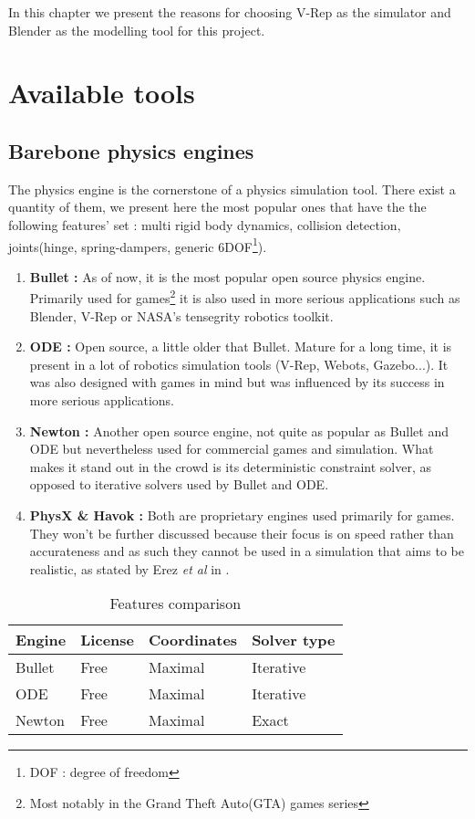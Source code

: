 In this chapter we present the reasons for choosing V-Rep as the simulator and Blender as the modelling tool for this project. 

\section{Available tools}
\subsection{Barebone physics engines}
The physics engine is the cornerstone of a physics simulation tool. There exist a quantity of them, we present here the most popular ones that have the the following features' set :  multi rigid body dynamics, collision detection, joints(hinge, spring-dampers, generic 6DOF\footnote{DOF : degree of freedom}). 

\begin{enumerate}
\item \textbf{Bullet :} As of now, it is the most popular open source physics engine. Primarily used for games\footnote{Most notably in the Grand Theft Auto(GTA) games series} it is also used in more serious applications such as Blender, V-Rep or NASA's tensegrity robotics toolkit. 

\item \textbf{ODE :} Open source, a little older that Bullet. Mature for a long time, it is present in a lot of robotics simulation tools (V-Rep, Webots, Gazebo...). It was also designed with games in mind but was influenced by its success in more serious applications.

\item \textbf{Newton :} Another open source engine, not quite as popular as Bullet and ODE but nevertheless used for commercial games and simulation. What makes it stand out in the crowd is its deterministic constraint solver, as opposed to iterative solvers used by Bullet and ODE.

\item \textbf{PhysX \& Havok :} Both are proprietary engines used primarily for games. They won't be further discussed because their focus is on speed rather than accurateness and as such they cannot be used in a simulation that aims to be realistic, as stated by Erez \textit{et al} in \cite{engines_comparison}.
\end{enumerate}

\begin{table}[htp]
\center
\begin{tabularx}{\textwidth}{@{} l l l l @{}}
\toprule
\textbf{Engine} & \textbf{License} & \textbf{Coordinates} &\textbf{Solver type}\\ 
\midrule
Bullet & Free & Maximal & Iterative \\ 

ODE & Free & Maximal & Iterative\\ 

Newton & Free & Maximal &  Exact\\

\bottomrule
\end{tabularx}
\caption{Features comparison\cite{engines_comparison}}
\label{table:specs}
\end{table}

